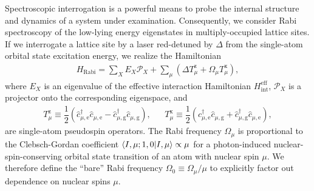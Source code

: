 \documentclass[preprint,showkeys,nofootinbib]{revtex4-1}
\renewcommand{\t}{\text} %
\newcommand{\f}{\dfrac} %
\newcommand{\p}[1]{\left(#1\right)} %
\newcommand{\bk}{\braket} %
\newcommand{\g}{\text{g}}
\newcommand{\e}{\text{e}}
\newcommand{\x}{\text{x}}
\newcommand{\z}{\text{z}}
\renewcommand{\c}{\hat{c}}
\renewcommand{\P}{\mathcal{P}}
\newcommand{\1}{\mathds{1}}
\begin{document}
Spectroscopic interrogation is a powerful means to probe the internal
structure and dynamics of a system under examination.  Consequently,
we consider Rabi spectroscopy of the low-lying energy eigenstates in
multiply-occupied lattice sites.  If we interrogate a lattice site by
a laser red-detuned by $\Delta$ from the single-atom orbital state
excitation energy, we realize the Hamiltonian
\begin{align}
  H_{\t{Rabi}}
  = \sum_X E_X \P_X
  + \sum_\mu\p{\Delta T_\mu^\z + \Omega_\mu T_\mu^\x},
  \label{eq:H_rabi}
\end{align}
where $E_X$ is an eigenvalue of the effective interaction Hamiltonian
$H_{\t{int}}^{\t{eff}}$, $\P_X$ is a projector onto the corresponding
eigenspace, and
\begin{align}
  T_\mu^\z \equiv \f12 \p{\c_{\mu,\e}^\dag \c_{\mu,\e}
    - \c_{\mu,\g}^\dag \c_{\mu,\g}},
  &&
  T_\mu^\x \equiv \f12 \p{\c_{\mu,\e}^\dag \c_{\mu,\g}
    + \c_{\mu,\g}^\dag \c_{\mu,\e}},
\end{align}
are single-atom pseudospin operators.  The Rabi frequency $\Omega_\mu$
is proportional to the Clebsch-Gordan coefficient
$\bk{I,\mu;1,0|I,\mu}\propto\mu$ for a photon-induced
nuclear-spin-conserving orbital state transition of an atom with
nuclear spin $\mu$.  We therefore define the ``bare'' Rabi frequency
$\Omega_0\equiv\Omega_\mu/\mu$ to explicitly factor out dependence on
nuclear spins $\mu$.
\end{document}
